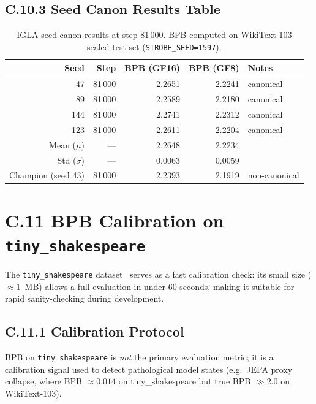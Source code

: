 \subsection*{C.10.3 Seed Canon Results Table}

\begin{table}[h]
\centering
\begin{tabular}{rrrrl}
\toprule
\textbf{Seed} & \textbf{Step} & \textbf{BPB (GF16)} &
\textbf{BPB (GF8)} & \textbf{Notes} \\
\midrule
 47 & 81\,000 & 2.2651 & 2.2241 & canonical \\
 89 & 81\,000 & 2.2589 & 2.2180 & canonical \\
144 & 81\,000 & 2.2741 & 2.2312 & canonical \\
123 & 81\,000 & 2.2611 & 2.2204 & canonical \\
\midrule
Mean ($\bar{\mu}$) & --- & 2.2648 & 2.2234 & \\
Std ($\sigma$)     & --- & 0.0063 & 0.0059 & \\
\midrule
Champion (seed 43) & 81\,000 & 2.2393 & 2.1919 & non-canonical \\
\bottomrule
\end{tabular}
\caption{IGLA seed canon results at step 81\,000.  BPB computed on
WikiText-103 sealed test set (\texttt{STROBE\_SEED=1597}).}
\end{table}

\section*{C.11 BPB Calibration on \texttt{tiny\_shakespeare}}
\label{sec:tiny-shakespeare-calibration}

The \texttt{tiny\_shakespeare} dataset~\cite{karpathy2015char} serves
as a fast calibration check: its small size ($\approx 1$~MB) allows a
full evaluation in under 60 seconds, making it suitable for rapid
sanity-checking during development.

\subsection*{C.11.1 Calibration Protocol}

BPB on \texttt{tiny\_shakespeare} is \emph{not} the primary evaluation
metric; it is a calibration signal used to detect pathological model
states (e.g.\ JEPA proxy collapse, where BPB $\approx 0.014$ on
tiny\_shakespeare but true BPB $\gg 2.0$ on WikiText-103).

